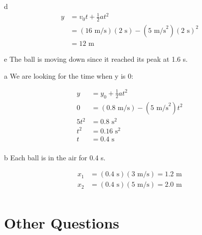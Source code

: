 \documentclass{exam}
\begin{document}
\begin{description}
\begin{description*}
\item[d]
\begin{align*}
  y &= v_0t + \frac{1}{2} at^2 \\
   &= (16 \text{ m/s}) (2 \text{ s}) - (5 \text{ m/s}^2)(2 \text{ s})^2 \\
   &= 12 \text{ m}
\end{align*}

\item[e]
The ball is moving down since it reached its peak at 1.6 s.

\end{description*}

\item[SP3]
\begin{description*}

\item[a] 
We are looking for the time when y is 0:

\begin{align*}
 y &= y_0 + \frac{1}{2} at^2 \\
 0 &= (0.8 \text{ m/s}) - (5 \text{ m/s}^2) t^2 \\
 5t^2 &= 0.8 \text{ s}^2 \\
  t^2 &= 0.16\text{ s}^2 \\
  t &= 0.4 \text{ s} \\
\end{align*}

\item[b]
Each ball is in the air for 0.4 s.

\begin{align*}
  x_1 &= (0.4 \text{ s}) (3 \text{ m/s}) = 1.2 \text{ m} \\
  x_2 &= (0.4 \text{ s}) (5 \text{ m/s}) = 2.0 \text{ m} \\
\end{align*}
\end{description*}

\end{description}

\fi

\section{Other Questions}
\end{document}
